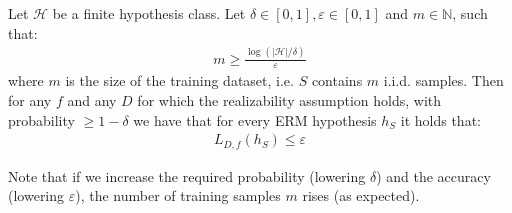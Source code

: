 \documentclass[../template.tex]{subfiles}
\begin{document}
\begin{thm} Let $\mathcal{H}$ be a finite hypothesis class. Let $\delta\in [0,1], \varepsilon \in [0,1]$ and $m \in \mathbb{N}$, such that:
    \begin{align*}
        m \geq \frac{\log(|\mathcal{H}|/\delta)}{\varepsilon} 
    \end{align*}   
where $m$ is the size of the training dataset, i.e. $S$ contains $m$ i.i.d. samples.   
Then for any $f$ and any $D$ for which the realizability assumption holds, with probability $\geq 1-\delta$ we have that for every ERM hypothesis $h_S$ it holds that:
\begin{align*}
    L_{D,f}(h_S) \leq \varepsilon
\end{align*}     
\end{thm} 
Note that if we increase the required probability (lowering $\delta$) and the accuracy (lowering $\varepsilon$), the number of training samples $m$ rises (as expected).
\end{document}
